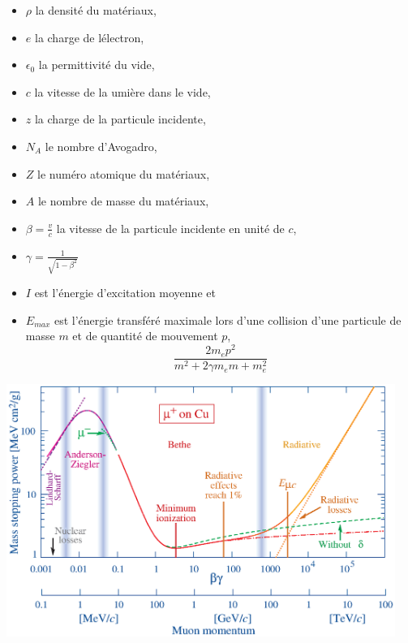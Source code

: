 \begin{itemize}[label=$\bullet$]
	\item $\rho$ la densité du matériaux,
	\item $e$ la charge de lélectron,
	\item $\epsilon_{0}$ la permittivité du vide,
	\item $c$ la vitesse de la umière dans le vide,
	\item $z$ la charge de la particule incidente,
	\item $N_{A}$ le nombre d'Avogadro,
	\item $Z$ le numéro atomique du matériaux,
	\item $A$ le nombre de masse du matériaux,
	\item $\beta=\frac{v}{c}$ la vitesse de la particule incidente en unité de $c$,
	\item $\gamma=\frac{1}{\sqrt{1-\beta^{2}}}$
	\item $I$ est l'énergie d'excitation moyenne et
	\item $E_{max}$ est l'énergie transféré maximale lors d'une collision d'une particule de masse $m$ et de quantité de mouvement $p$,
	\begin{equation}
	\frac{2m_{e}p^{2}}{m^2+2\gamma m_{e}m+m_{e}^2}
	\end{equation}
\end{itemize}

\begin{minipagewithmarginpars}[h]{0.95\textwidth}
	\centering
	\includegraphics[width=0.95\textwidth]{RPC/Bethe-Bloch.eps}
	\label{Bethe-Block}
\end{minipagewithmarginpars}

